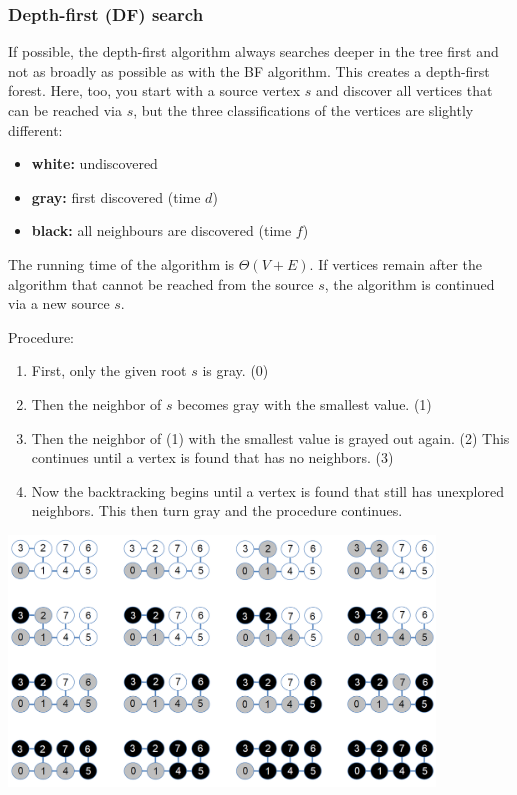 %

\subsubsection{Depth-first (DF) search}

If possible, the depth-first algorithm always searches deeper in the tree first and not as broadly as possible as with the BF algorithm. This creates a depth-first forest. Here, too, you start with a source vertex $s$ and discover all vertices that can be reached via $s$, but the three classifications of the vertices are slightly different:

\begin{itemize}
    \item \textbf{white:} undiscovered
    \item \textbf{gray:} first discovered (time $d$)
    \item \textbf{black:} all neighbours are discovered (time $f$)
\end{itemize}

The running time of the algorithm is $\Theta(V+E)$. If vertices remain after the algorithm that cannot be reached from the source $s$, the algorithm is continued via a new source $s$.

Procedure:
\begin{enumerate}
    \item First, only the given root $s$ is gray. (0)
    \item Then the neighbor of $s$ becomes gray with the smallest value. (1)
    \item Then the neighbor of (1) with the smallest value is grayed out again. (2) This continues until a vertex is found that has no neighbors. (3)
    \item Now the backtracking begins until a vertex is found that still has unexplored neighbors. This then turn gray and the procedure continues.
\end{enumerate}

\begin{center}\includegraphics[width=0.85\textwidth]{img/graphs/DfSearch.png}\end{center}

